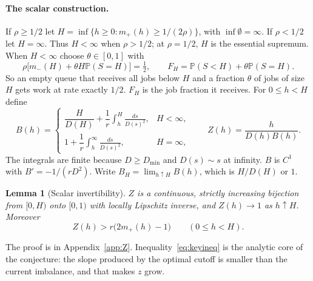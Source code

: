 \documentclass[11pt]{article}
\numberwithin{equation}{section}
\newtheorem{lemma}[theorem]{Lemma}
\theoremstyle{definition}
\theoremstyle{remark}
\newcommand{\Prob}{\mathbb{P}}
\begin{document}
\paragraph{The scalar construction.} If $\rho\ge1/2$ let $H=\inf\{h\ge0:m_+(h)\ge1/(2\rho)\}$, with $\inf\emptyset=\infty$. If $\rho<1/2$ let $H=\infty$. Thus $H<\infty$ when $\rho>1/2$; at $\rho=1/2$, $H$ is the essential supremum. When $H<\infty$ choose $\theta\in[0,1]$ with
\begin{equation}\label{eq:theta}
\rho\bigl[m_-(H)+\theta H\Prob(S=H)\bigr]=\tfrac12,\qquad F_H=\Prob(S<H)+\theta\Prob(S=H).
\end{equation}
So an empty queue that receives all jobs below $H$ and a fraction $\theta$ of jobs of size $H$ gets work at rate exactly $1/2$. $F_H$ is the job fraction it receives. For $0\le h<H$ define
\begin{equation}\label{eq:B}
B(h)=\begin{cases}\dfrac{H}{D(H)}+\dfrac1r\displaystyle\int_h^H\frac{ds}{D(s)^2},&H<\infty,\\[2ex]
1+\dfrac1r\displaystyle\int_h^\infty\frac{ds}{D(s)^2},&H=\infty,\end{cases}
\qquad Z(h)=\frac{h}{D(h)B(h)}.
\end{equation}
The integrals are finite because $D\ge D_{\min}$ and $D(s)\sim s$ at infinity. $B$ is $C^1$ with $B'=-1/(rD^2)$. Write $B_H=\lim_{h\uparrow H}B(h)$, which is $H/D(H)$ or $1$.

\begin{lemma}[Scalar invertibility]\label{lem:Z}
$Z$ is a continuous, strictly increasing bijection from $[0,H)$ onto $[0,1)$ with locally Lipschitz inverse, and $Z(h)\to1$ as $h\uparrow H$. Moreover
\begin{equation}\label{eq:keyineq}
Z(h)>r\bigl(2m_+(h)-1\bigr)\qquad(0\le h<H).
\end{equation}
\end{lemma}

The proof is in Appendix~\ref{app:Z}. Inequality~\eqref{eq:keyineq} is the analytic core of the conjecture: the slope produced by the optimal cutoff is smaller than the current imbalance, and that makes $z$ grow.
\end{document}
